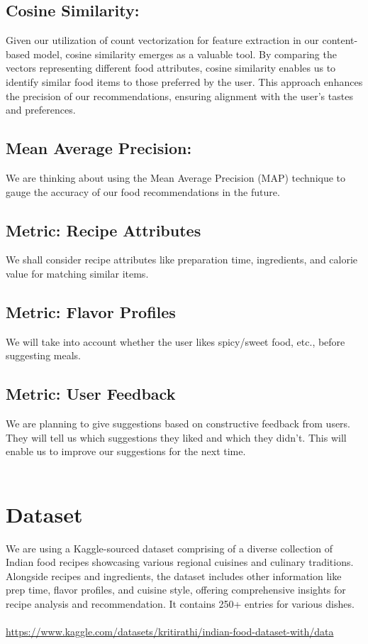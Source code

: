 \documentclass[conference]{IEEEtran}
\begin{document}
\subsection{Cosine Similarity:} 
Given our utilization of count vectorization for feature extraction in our content-based model, cosine similarity emerges as a valuable tool. By comparing the vectors representing different food attributes, cosine similarity enables us to identify similar food items to those preferred by the user. This approach enhances the precision of our recommendations, ensuring alignment with the user's tastes and preferences.
\\
\subsection{Mean Average Precision:}
We are thinking about using the Mean Average Precision (MAP) technique to gauge the accuracy of our food recommendations in the future.
\\
\subsection{Metric: Recipe Attributes}
We shall consider recipe attributes like preparation time, ingredients, and calorie value for matching similar items.
\\
\subsection{Metric: Flavor Profiles}
We will take into account whether the user likes spicy/sweet food, etc., before suggesting meals.
\\
\subsection{Metric: User Feedback}
We are planning to give suggestions based on constructive feedback from users. They will tell us which suggestions they liked and which they didn't. This will enable us to improve our suggestions for the next time.
\\\\
\section{Dataset}
We are using a Kaggle-sourced dataset comprising of a diverse collection of Indian food recipes showcasing various regional cuisines and culinary traditions. Alongside recipes and ingredients, the dataset includes other information like prep time, flavor profiles, and cuisine style, offering comprehensive insights for recipe analysis and recommendation.
It contains 250+ entries for various dishes. 
\\\\
\url{https://www.kaggle.com/datasets/kritirathi/indian-food-dataset-with/data}
\\\\
\end{document}
